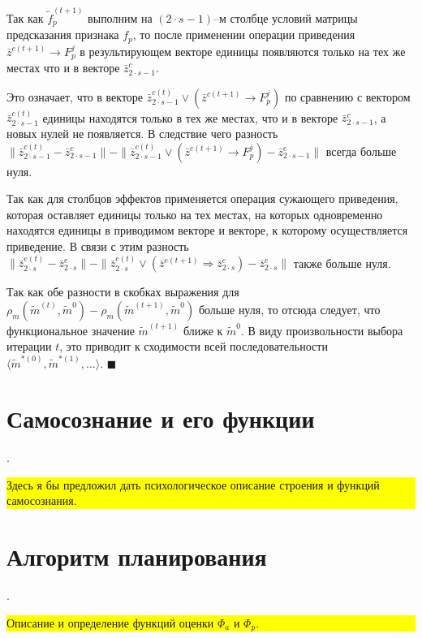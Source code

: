 \documentclass[a4paper, 12pt]{article}
\theoremstyle{plain}
\newenvironment{Proof}%
	{\par\noindent{\bf Доказательство.}}%
	{\hfill$\scriptstyle\blacksquare$}
\begin{document}
\begin{Proof}
		Так как $\tilde f_p^{(t+1)}$ выполним на $(2\cdot s-1)$–м столбце условий матрицы предсказания признака $f_p$, то после применении операции приведения $\bar z^{c(t+1)}\rightarrow F_p^j$ в результирующем векторе единицы появляются только на тех же местах что и в векторе $\bar z_{2\cdot s-1}^c$. 
		
		Это означает, что в векторе $\bar z_{2\cdot s-1}^{c(t)}\vee(\bar z^{c(t+1)}\rightarrow F_p^j)$ по сравнению с вектором $\bar z_{2\cdot s-1}^{c(t)}$  единицы находятся только в тех же местах, что и в векторе $\bar z_{2\cdot s-1}^c$, а новых нулей не появляется. В следствие чего разность $\|\bar z_{2\cdot s-1}^{c(t)}-\bar z_{2\cdot s-1}^c\|-\|\bar z_{2\cdot s-1}^{c(t)}\vee(\bar z^{c(t+1)}\rightarrow F_p^j)-\bar z_{2\cdot s-1}^c\|$ всегда больше нуля.
		
		Так как для столбцов эффектов применяется операция сужающего приведения, которая оставляет единицы только на тех местах, на которых одновременно находятся единицы в приводимом векторе и векторе, к которому осуществляется приведение. В связи с этим разность $\|\bar z_{2\cdot s}^{e(t)}-\bar z_{2\cdot s}^e\|-\|\bar z_{2\cdot s}^{e(t)}\vee(\bar z^{e(t+1)}\Rightarrow\bar z_{2\cdot s}^e)-\bar z_{2\cdot s}^e\|$ также больше нуля.
		
		Так как обе разности в скобках выражения для $\rho_m(\tilde m^{(t)},\tilde m^0)-\rho_m(\tilde m^{(t+1)},\tilde m^0)$ больше нуля, то отсюда следует, что функциональное значение $\tilde m^{(t+1)}$ ближе к $\tilde m^0$. В виду произвольности выбора итерации $t$, это приводит к сходимости всей последовательности $\langle\tilde m^{*(0)},\tilde m^{*(1)},\dots\rangle$. 
	\end{Proof}
	
	\section{Самосознание и его функции} .
	
	\noindent\colorbox{yellow}{
		\parbox{\dimexpr\linewidth-2\fboxsep}{Здесь я бы предложил дать психологическое описание строения и функций самосознания.}
	}
	
	\section{Алгоритм планирования}	.

	\noindent\colorbox{yellow}{
		\parbox{\dimexpr\linewidth-2\fboxsep}{Описание и определение функций оценки $\Phi_a$ и $\Phi_p$.}
	}
\end{document}
